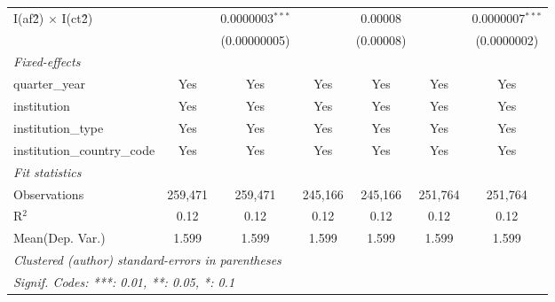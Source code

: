 \begin{tabular}{lcccccc}
   I(af\^2) $\times$ I(ct\^2)         &               & 0.0000003$^{***}$ &               & 0.00008        &               & 0.0000007$^{***}$\\   
                                      &               & (0.00000005)      &               & (0.00008)      &               & (0.0000002)\\   
   \midrule
   \emph{Fixed-effects}\\
   quarter\_year                      & Yes           & Yes               & Yes           & Yes            & Yes           & Yes\\  
   institution                        & Yes           & Yes               & Yes           & Yes            & Yes           & Yes\\  
   institution\_type                  & Yes           & Yes               & Yes           & Yes            & Yes           & Yes\\  
   institution\_country\_code         & Yes           & Yes               & Yes           & Yes            & Yes           & Yes\\  
   \midrule
   \emph{Fit statistics}\\
   Observations                       & 259,471       & 259,471           & 245,166       & 245,166        & 251,764       & 251,764\\  
   R$^2$                              & 0.12          & 0.12              & 0.12          & 0.12           & 0.12          & 0.12\\  
Mean(Dep. Var.) & 1.599 & 1.599 & 1.599 & 1.599 & 1.599 & 1.599 \\
   \midrule \midrule
   \multicolumn{7}{l}{\emph{Clustered (author) standard-errors in parentheses}}\\
   \multicolumn{7}{l}{\emph{Signif. Codes: ***: 0.01, **: 0.05, *: 0.1}}\\
\end{tabular}
\par\endgroup
